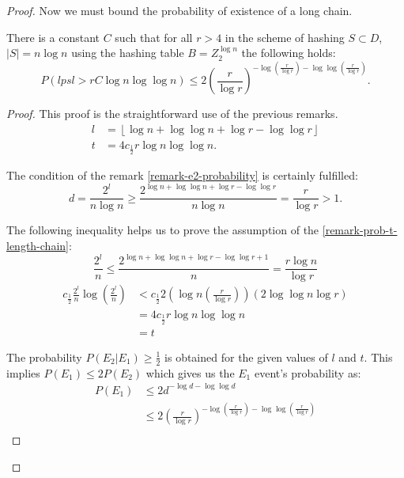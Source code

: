 \begin{proof}
Now we must bound the probability of existence of a long chain.
\begin{remark}
There is a constant $C$ such that for all $r > 4$ in the scheme of hashing $S \subset D$, $|S| = n \log n$ using the hashing table $B = Z_2^{\log n}$ the following holds:
\begin{displaymath}
P(lpsl > rC \log n \log \log n) \leq 2 \left(\frac{r}{\log r}\right)^{-\log \left(\frac{r}{\log r}\right) - \log \log \left(\frac{r}{\log r}\right)}\textit{.}
\end{displaymath}
\end{remark}
\begin{proof}
This proof is the straightforward use of the previous remarks.
\begin{displaymath}
\begin{split}
l & = \left\lfloor \log n + \log \log n + \log r - \log \log r \right\rfloor \\
t & = 4c_{\frac{1}{2}}r\log n \log \log n \textit{.}
\end{split}
\end{displaymath}

The condition of the remark \ref{remark-e2-probability} is certainly fulfilled:
\begin{displaymath}
d = \frac{2^l}{n \log n} \geq \frac{2^{\log n + \log \log n + \log r - \log \log r}}{n \log n} = \frac{r}{\log r} > 1\textit{.}
\end{displaymath}

The following inequality helps us to prove the assumption of the \ref{remark-prob-t-length-chain}:
\begin{displaymath}
\frac{2^l}{n} \leq \frac{2 ^{\log n + \log \log n + \log r - \log \log r + 1}}{n} = \frac{r\log n}{\log r}
\end{displaymath}
\begin{displaymath}
\begin{split}
c_{\frac{1}{2}}\frac{2^l}{n}\log\left(\frac{2^l}{n}\right)
	& < c_{\frac{1}{2}} 2 \left(\log n \left(\frac{r}{\log r}\right)\right)\left(2\log\log n \log r\right) \\
	& = 4 c_{\frac{1}{2}} r \log n \log \log n \\
	& = t
\end{split}
\end{displaymath}

The probability $P(E_2 | E_1) \geq \frac{1}{2}$ is obtained for the given values of $l$ and $t$. This implies $P(E_1) \leq 2 P(E_2)$ which gives us the $E_1$ event's probability as:
\begin{displaymath}
\begin{split}
P(E_1) 
	& \leq 2d^{-\log d - \log \log d} \\
	& \leq 2\left(\frac{r}{\log r}\right)^{-\log \left(\frac{r}{\log r}\right) - \log \log \left(\frac{r}{\log r}\right)} \\
\end{split}
\end{displaymath}


\end{proof}
\end{proof}
